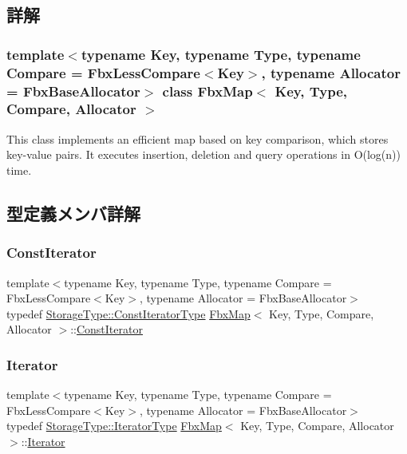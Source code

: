 \subsection{詳解}
\subsubsection*{template$<$typename Key, typename Type, typename Compare = Fbx\+Less\+Compare$<$\+Key$>$, typename Allocator = Fbx\+Base\+Allocator$>$\newline
class Fbx\+Map$<$ Key, Type, Compare, Allocator $>$}

This class implements an efficient map based on key comparison, which stores key-\/value pairs. It executes insertion, deletion and query operations in O(log(n)) time. 

\subsection{型定義メンバ詳解}
\mbox{\label{class_fbx_map_acf89f4bb5cf415e5e04087c2179bf367}} 
\subsubsection{\texorpdfstring{Const\+Iterator}{ConstIterator}}
{\footnotesize\ttfamily template$<$typename Key, typename Type, typename Compare = Fbx\+Less\+Compare$<$\+Key$>$, typename Allocator = Fbx\+Base\+Allocator$>$ \\
typedef \hyperlink{class_fbx_red_black_tree_a7309ae5e1bb24e7e3da94fef975d10c4}{Storage\+Type\+::\+Const\+Iterator\+Type} \hyperlink{class_fbx_map}{Fbx\+Map}$<$ Key, Type, Compare, Allocator $>$\+::\hyperlink{class_fbx_map_acf89f4bb5cf415e5e04087c2179bf367}{Const\+Iterator}}

\mbox{\label{class_fbx_map_ab0989f3b30c0c8652ff9ee1b28b5c1af}} 
\subsubsection{\texorpdfstring{Iterator}{Iterator}}
{\footnotesize\ttfamily template$<$typename Key, typename Type, typename Compare = Fbx\+Less\+Compare$<$\+Key$>$, typename Allocator = Fbx\+Base\+Allocator$>$ \\
typedef \hyperlink{class_fbx_red_black_tree_af7b6209131012ec5aa33e0286c956cd6}{Storage\+Type\+::\+Iterator\+Type} \hyperlink{class_fbx_map}{Fbx\+Map}$<$ Key, Type, Compare, Allocator $>$\+::\hyperlink{class_fbx_map_ab0989f3b30c0c8652ff9ee1b28b5c1af}{Iterator}}

